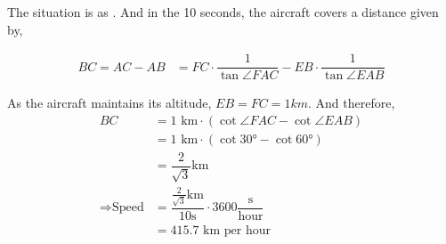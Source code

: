 \begin{solution}[\halfpage]
	The situation is as \asif. And in the 10 seconds, the aircraft covers 
	a distance given by, 
	
	\begin{align}
		BC = AC - AB &= FC\cdot\dfrac{1}{\tan\angle{FAC}} - EB\cdot\dfrac{1}{\tan\angle{EAB}}
	\end{align}
	
	As the aircraft maintains its altitude, $EB = FC = 1km$. And therefore, 
	\begin{align}
		BC &= \text{1 km}\cdot\left(\cot\angle{FAC} - \cot\angle{EAB}\right) \\
		   &= \text{1 km}\cdot\left(\cot\ang{30} - \cot\ang{60}\right) \\
		   &= \dfrac{2}{\sqrt{3}}\text{km} \\
		\Rightarrow \text{Speed} &= \dfrac{\frac{2}{\sqrt{3}}\text{km}}{10\text{s}}\cdot 3600\dfrac{\text{s}}{\text{hour}} \\
		   &= 415.7\text{ km per hour}
	\end{align}
\end{solution}
